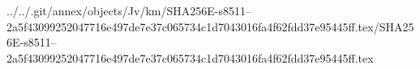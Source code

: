 ../../.git/annex/objects/Jv/km/SHA256E-s8511--2a5f43099252047716e497de7e37c065734c1d7043016fa4f62fdd37e95445ff.tex/SHA256E-s8511--2a5f43099252047716e497de7e37c065734c1d7043016fa4f62fdd37e95445ff.tex